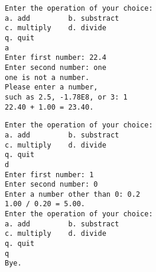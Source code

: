 \documentclass[12pt,notheorems]{beamer}
\begin{document}
\begin{frame}[fragile]
\begin{lstlisting}
Enter the operation of your choice:
a. add         b. substract
c. multiply    d. divide
q. quit
a
Enter first number: 22.4
Enter second number: one
one is not a number.
Please enter a number,
such as 2.5, -1.78E8, or 3: 1
22.40 + 1.00 = 23.40.
\end{lstlisting}
\end{frame}

\begin{frame}[fragile]
\begin{lstlisting}[backgroundcolor=\color{blue!20}]
Enter the operation of your choice:
a. add         b. substract
c. multiply    d. divide
q. quit
d
Enter first number: 1
Enter second number: 0
Enter a number other than 0: 0.2
1.00 / 0.20 = 5.00.
Enter the operation of your choice:
a. add         b. substract
c. multiply    d. divide
q. quit
q
Bye.
\end{lstlisting}
\end{frame}
\end{document}
